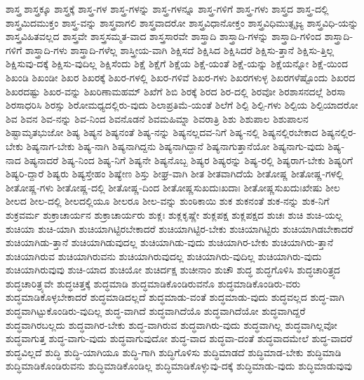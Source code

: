 {ಶಾಸ್ತ್ರ
ಶಾಸ್ತ್ರಕ್ಕೂ
ಶಾಸ್ತ್ರಕ್ಕೆ
ಶಾಸ್ತ್ರ-ಗಳ
ಶಾಸ್ತ್ರ-ಗಳನ್ನು
ಶಾಸ್ತ್ರ-ಗಳನ್ನೂ
ಶಾಸ್ತ್ರ-ಗಳಿಗೆ
ಶಾಸ್ತ್ರ-ಗಳು
ಶಾಸ್ತ್ರದ
ಶಾಸ್ತ್ರ-ದಲ್ಲಿ
ಶಾಸ್ತ್ರಮಿದಮುಕ್ತಂ
ಶಾಸ್ತ್ರ-ವನ್ನು
ಶಾಸ್ತ್ರವಾಗಲಿ
ಶಾಸ್ತ್ರವಾದರೋ
ಶಾಸ್ತ್ರವಿಧಾನೋಕ್ತಂ
ಶಾಸ್ತ್ರವಿಧಿಮುತ್ಸೃಜ್ಯ
ಶಾಸ್ತ್ರವಿಧಿ-ಯನ್ನು
ಶಾಸ್ತ್ರವಿಹಿತವಲ್ಲದ
ಶಾಸ್ತ್ರವೇ
ಶಾಸ್ತ್ರಸಮ್ಮತ-ವಾದ
ಶಾಸ್ತ್ರಸಾರವೇ
ಶಾಸ್ತ್ರಾದಿ
ಶಾಸ್ತ್ರಾದಿ-ಗಳನ್ನು
ಶಾಸ್ತ್ರಾದಿ-ಗಳಿಂದ
ಶಾಸ್ತ್ರಾದಿ-ಗಳಿಗೆ
ಶಾಸ್ತ್ರಾದಿ-ಗಳು
ಶಾಸ್ತ್ರಾದಿ-ಗಳೆಲ್ಲ
ಶಾಸ್ತ್ರೀಯ-ವಾಗಿ
ಶಿಕ್ಷಿಸದೆ
ಶಿಕ್ಷಿಸಿದ
ಶಿಕ್ಷಿಸಿದರೆ
ಶಿಕ್ಷಿಸು-ತ್ತಾನೆ
ಶಿಕ್ಷಿಸು-ತ್ತಿಲ್ಲ
ಶಿಕ್ಷಿಸುವು-ದಕ್ಕೆ
ಶಿಕ್ಷಿಸು-ವುದಿಲ್ಲ
ಶಿಕ್ಷಿಸೆಂದು
ಶಿಕ್ಷೆ
ಶಿಕ್ಷೆಗೆ
ಶಿಕ್ಷೆಯ
ಶಿಕ್ಷೆ-ಯಂತೆ
ಶಿಕ್ಷೆ-ಯನ್ನು
ಶಿಕ್ಷೆಯನ್ನೋ
ಶಿಕ್ಷೆ-ಯಿಂದ
ಶಿಖಂಡಿ
ಶಿಖಂಡೀ
ಶಿಖರ
ಶಿಖರಕ್ಕೆ
ಶಿಖರ-ಗಳಲ್ಲಿ
ಶಿಖರ-ಗಳಿವೆ
ಶಿಖರ-ಗಳು
ಶಿಖರಗಳುಳ್ಳ
ಶಿಖರಗಳೆಷ್ಟೊಂದು
ಶಿಖರದ
ಶಿಖರದಷ್ಟು
ಶಿಖರ-ವನ್ನು
ಶಿಖರಿಣಾಮಹಮ್
ಶಿಖೆಗೆ
ಶಿಬಿ
ಶಿರಕ್ಕೆ
ಶಿರದ
ಶಿರ-ದಲ್ಲಿ
ಶಿರವೋ
ಶಿರಶಾಸನದಲ್ಲೆ
ಶಿರಸಾ
ಶಿರಸಾಧರಿಸಿ
ಶಿರಸ್ಸು
ಶಿರೋಮಧ್ಯದಲ್ಲಿರು-ವುದು
ಶಿಲಾಪ್ರತಿಮೆ-ಯಂತೆ
ಶಿಲೆಗೆ
ಶಿಲ್ಪಿ
ಶಿಲ್ಪಿ-ಗಳು
ಶಿಲ್ಪಿಯ
ಶಿಲ್ಪಿಯಾದರೋ
ಶಿವ
ಶಿವನ
ಶಿವ-ನನ್ನು
ಶಿವ-ನಿಂದ
ಶಿವನೊಡನೆ
ಶಿವಮಹಿಮ್ನಾ
ಶಿವರಾತ್ರಿ
ಶಿಶು
ಶಿಶುಪಾಲ
ಶಿಶುಪಾಲನ
ಶಿಷ್ಟಾಮೃತಭುಜೋ
ಶಿಷ್ಯ
ಶಿಷ್ಯನ
ಶಿಷ್ಯನಂತೆ
ಶಿಷ್ಯ-ನನ್ನು
ಶಿಷ್ಯನಲ್ಲದವ-ನಿಗೆ
ಶಿಷ್ಯ-ನಲ್ಲಿ
ಶಿಷ್ಯನಲ್ಲಿರಬೇಕಾದ
ಶಿಷ್ಯನಲ್ಲಿರ-ಬೇಕು
ಶಿಷ್ಯನಾಗ-ಬೇಕು
ಶಿಷ್ಯ-ನಾಗಿ
ಶಿಷ್ಯನಾಗಿದ್ದನು
ಶಿಷ್ಯನಾಗಿದ್ದಾನೆ
ಶಿಷ್ಯನಾಗುತ್ತಾನೆಯೋ
ಶಿಷ್ಯನಾಗು-ವುದು
ಶಿಷ್ಯ-ನಾದ
ಶಿಷ್ಯನಾದರೆ
ಶಿಷ್ಯ-ನಿಂದ
ಶಿಷ್ಯ-ನಿಗೆ
ಶಿಷ್ಯನೇ
ಶಿಷ್ಯನೊಬ್ಬ
ಶಿಷ್ಯರ
ಶಿಷ್ಯರನ್ನು
ಶಿಷ್ಯ-ರಲ್ಲಿ
ಶಿಷ್ಯರಾಗ-ಬೇಕು
ಶಿಷ್ಯರಿಗೆ
ಶಿಷ್ಯರಿ-ದ್ದಾರೆ
ಶಿಷ್ಯರು
ಶಿಷ್ಯಸ್ತೇಹಂ
ಶಿಷ್ಯೇಣ
ಶಿಸ್ತು
ಶೀಘ್ರ-ವಾಗಿ
ಶೀತ
ಶೀತವಾಗಿದೆಯೆ
ಶೀತೋಷ್ಣ
ಶೀತೋಷ್ಣ-ಗಳಲ್ಲಿ
ಶೀತೋಷ್ಣ-ಗಳು
ಶೀತೋಷ್ಣ-ದಲ್ಲಿ
ಶೀತೋಷ್ಣ-ದಿಂದ
ಶೀತೋಷ್ಣಸುಖದುಃಖದಾಃ
ಶೀತೋಷ್ಣಸುಖದುಃಖೇಷು
ಶೀಲ
ಶೀಲದ
ಶೀಲ-ದಲ್ಲಿ
ಶೀಲದಲ್ಲಿಯೂ
ಶೀಲರೂ
ಶೀಲ-ವನ್ನು
ಶುಂಠಿಕಾಯಿ
ಶುಕ
ಶುಕನಂತೆ
ಶುಕ-ನನ್ನು
ಶುಕ-ನಿಗೆ
ಶುಕ್ರವರ್ಮ
ಶುಕ್ರಾಚಾರ್ಯನ
ಶುಕ್ರಾಚಾರ್ಯರು
ಶುಕ್ಲಃ
ಶುಕ್ಲಕೃಷ್ಣೇ
ಶುಕ್ಲಪಕ್ಷ
ಶುಕ್ಲಪಕ್ಷದ
ಶುಚಃ
ಶುಚಿ
ಶುಚಿ-ಯಲ್ಲ
ಶುಚಿಯಾ
ಶುಚಿ-ಯಾಗಿ
ಶುಚಿಯಾಗಿಟ್ಟಿರಬೇಕಾದರೆ
ಶುಚಿಯಾಗಿಟ್ಟಿರ-ಬೇಕು
ಶುಚಿಯಾಗಿಟ್ಟಿರು
ಶುಚಿಯಾಗಿಡಬೇಕಾದರೆ
ಶುಚಿಯಾಗಿಡು-ತ್ತಾನೆ
ಶುಚಿಯಾಗಿಡುವುದಲ್ಲ
ಶುಚಿಯಾಗಿಡು-ವುದು
ಶುಚಿಯಾಗಿರ-ಬೇಕು
ಶುಚಿಯಾಗಿರು-ತ್ತಾನೆ
ಶುಚಿಯಾಗಿರುವ
ಶುಚಿಯಾಗಿರುವನು
ಶುಚಿಯಾಗಿರುವುದಲ್ಲ
ಶುಚಿಯಾಗಿರು-ವುದಿಲ್ಲ
ಶುಚಿಯಾಗಿರು-ವುದು
ಶುಚಿಯಾಗಿರುವುವು
ಶುಚಿ-ಯಾದ
ಶುಚಿಯೋ
ಶುಚಿರ್ದಕ್ಷ
ಶುಚೀನಾಂ
ಶುಚೌ
ಶುದ್ಧ
ಶುದ್ಧಗೊಳಿಸಿ
ಶುದ್ಧಚಾರಿತ್ರ್ಯದ
ಶುದ್ಧಚಾರಿತ್ರ್ಯವೇ
ಶುದ್ಧಚಿತ್ತಕ್ಕೆ
ಶುದ್ಧಮಾಡಿ
ಶುದ್ಧಮಾಡಿಕೊಂಡಿರುವನೊ
ಶುದ್ಧಮಾಡಿಕೊಂಡಿರು-ವರು
ಶುದ್ಧಮಾಡಿಕೊಳ್ಳಬೇಕಾದರೆ
ಶುದ್ಧಮಾಡಿದಲ್ಲದೆ
ಶುದ್ಧಮಾಡು-ವಂತೆ
ಶುದ್ಧಮಾಡು-ವುದು
ಶುದ್ಧವಲ್ಲದ
ಶುದ್ಧ-ವಾಗಿ
ಶುದ್ಧವಾಗಿಟ್ಟುಕೊಂಡಿರು-ವುದಿಲ್ಲ
ಶುದ್ಧ-ವಾಗಿದೆ
ಶುದ್ಧವಾಗಿದೆಯೊ
ಶುದ್ಧವಾಗಿದೆಯೋ
ಶುದ್ಧವಾಗಿದ್ದರೆ
ಶುದ್ಧವಾಗಿರಬಲ್ಲದು
ಶುದ್ಧವಾಗಿರ-ಬೇಕು
ಶುದ್ಧ-ವಾಗಿರುವ
ಶುದ್ಧವಾಗಿರು-ವುದು
ಶುದ್ಧವಾಗಿಲ್ಲ
ಶುದ್ಧವಾಗಿಲ್ಲವೋ
ಶುದ್ಧವಾಗುತ್ತ
ಶುದ್ಧ-ವಾಗು-ವುದು
ಶುದ್ಧವಾಗುವುದೋ
ಶುದ್ಧ-ವಾದ
ಶುದ್ಧವಾ-ದಂತೆ
ಶುದ್ಧವಾದಮೇಲೆ
ಶುದ್ಧ-ವಾದರೆ
ಶುದ್ಧವಿಲ್ಲದೆ
ಶುದ್ಧಿ
ಶುದ್ಧಿ-ಯಾಗಿಯೂ
ಶುದ್ಧಿ-ಗಾಗಿ
ಶುದ್ಧಿಗೊಳಿಸು
ಶುದ್ಧಿಮಾಡದೆ
ಶುದ್ಧಿಮಾಡ-ಬೇಕು
ಶುದ್ಧಿಮಾಡಿ
ಶುದ್ಧಿಮಾಡಿಕೊಂಡಿರುವನು
ಶುದ್ಧಿಮಾಡಿಕೊಂಡಿಲ್ಲ
ಶುದ್ಧಿಮಾಡಿಕೊಳ್ಳುವು-ದಕ್ಕೆ
ಶುದ್ಧಿಮಾಡು-ವುದು
ಶುದ್ಧಿಮಾಡುವುವು
}

